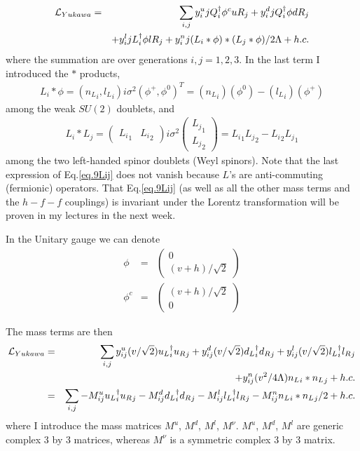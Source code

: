 \documentclass[12pt]{article}
\begin{document}
  \begin{eqnarray}
    {\cal L}_{Yukawa} =&& \sum_{i,j} y^u_ij Q_i^\dagger \phi^c uR_j
                          + y^d_ij Q_i^\dagger \phi   dR_j
                          \nonumber \\&&+ y^l_ij L_i^\dagger \phi   lR_j
                          + y^n_ij (L_i*\phi)*(L_j*\phi)/2\Lambda
                          + h.c.
  \end{eqnarray}
   where the summation are over generations $i,j = 1,2,3$.
  In the last term I introduced the $*$ products,
\begin{eqnarray}
  L_i*\phi = ({n_L}_i, {l_L}_i) i\sigma^2 (\phi^+, \phi^0)^T
               = ({n_L}_i)(\phi^0) - ({l_L}_i)(\phi^+)
\end{eqnarray}
  among the weak $SU(2)$ doublets, and
\begin{eqnarray}
  L_i*L_j = 
  \begin{pmatrix}
    {L_i}_1 & {L_i}_2
  \end{pmatrix}
  i\sigma^2 
  \begin{pmatrix}
    {L_j}_1 \\{L_j}_2
  \end{pmatrix}
  = {L_i}_1 {L_j}_2 - {L_i}_2 {L_j}_1 \label{eq.9Lij}
\end{eqnarray}
  among the two left-handed spinor doublets (Weyl spinors).  Note that
  the last expression of Eq.\ref{eq.9Lij} does not vanish because $L$'s are
  anti-commuting (fermionic) operators.  That Eq.\ref{eq.9Lij} (as well as all the other mass terms and the $h-f-f$ couplings) is invariant under the
  Lorentz transformation will be proven in my lectures in the next 
week.

  In the Unitary gauge we can denote
  \begin{eqnarray}
    \phi&=&
    \begin{pmatrix}
      0 \\ (v+h)/\sqrt2
    \end{pmatrix} \\
    \phi^c&=&
    \begin{pmatrix}
      (v+h)/\sqrt2  \\0 
    \end{pmatrix} 
  \end{eqnarray}

  The mass terms are then
\begin{eqnarray}
  {\cal L}_{Yukawa}
    &=& \sum_{i,j} y^u_{ij} (v/\sqrt2) {u_L}_i^\dagger {u_R}_j
               + y^d_{ij} (v/\sqrt2) {d_L}_i^\dagger {d_R}_j
               + y^l_{ij} (v/\sqrt2) {l_L}_i^\dagger {l_R}_j
               \nonumber \\ &&+ y^n_{ij} (v^2/4\Lambda) {n_L}_i*{n_L}_j
               + h.c. \\
    &=& \sum_{i,j} -M^u_{ij} {u_L}_i^\dagger {u_R}_j
                 -M^d_{ij} {d_L}_i^\dagger {d_R}_j
                 -M^l_{ij} {l_L}_i^\dagger {l_R}_j
                 -M^n_{ij} {n_L}_i*{n_L}_j/2
                 + h.c.
\end{eqnarray}
  where I introduce the mass matrices $M^u$, $M^d$, $M^l$, $M^\nu$.
  $M^u$, $M^d$, $M^l$ are generic complex 3 by 3 matrices, whereas
  $M^\nu$ is a symmetric complex 3 by 3 matrix.
\end{document}
